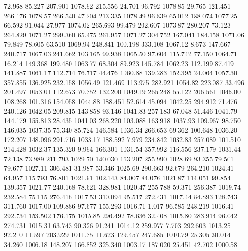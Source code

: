   72.968   85.227  207.901      1078.92
 215.556   24.701   96.792      1078.85
  29.765  121.451  266.176      1078.57
 266.540   47.204  213.335      1078.49
  96.839   65.012  188.074      1077.25
  66.592   91.044   27.977      1074.02
 265.693   99.479  202.607      1073.87
 280.207   73.123  264.829      1071.27
 299.360   65.475  261.957      1071.27
 304.752  167.041  184.158      1071.06
  79.849   78.605   63.510      1069.94
 248.841  100.198  333.108      1067.12
   8.673  147.667  240.717      1067.03
 241.662  103.165   99.938      1065.50
  97.604  115.742   77.150      1064.71
  16.214  149.368  199.480      1063.77
  68.304   89.923  145.784      1062.23
 112.199   87.419  141.887      1061.17
 112.714   76.717   44.476      1060.88
 139.283  152.395   24.064      1057.30
 357.855  136.925  232.158      1056.49
 121.469  113.975  282.921      1054.82
 223.087   33.496  201.497      1053.01
 112.673   70.352  132.200      1049.19
 265.248   55.122  206.561      1045.00
 108.268  101.316  154.058      1044.88
 188.451   52.614   45.094      1042.25
 294.912   71.476  240.126      1042.05
 209.815  143.858   93.146      1041.83
 257.183   67.048   51.446      1041.79
 144.179  155.813   28.435      1041.03
 268.220  103.088  163.918      1037.93
 109.967   98.750  146.035      1037.35
  75.340   85.724  146.584      1036.34
 266.653   69.362  100.648      1036.20
 172.207  148.096  291.716      1033.17
 188.592    7.979  234.842      1032.83
 257.089  101.510  214.428      1032.37
 135.320    9.994  166.301      1031.54
 357.992  116.556  237.179      1031.44
  72.138   73.989  211.793      1029.70
 140.030  163.207  255.990      1028.69
  93.355   79.501   79.677      1027.11
 306.481   31.987   53.346      1025.69
 290.663   92.679  264.210      1024.41
  64.957  115.793   76.801      1021.91
 102.143   84.007   84.076      1021.87
 114.051   99.854  139.357      1021.77
 240.168   78.621  328.981      1020.47
 255.788   59.371  256.387      1019.74
 232.584   75.115  276.418      1017.53
 310.094   95.517  272.431      1017.44
  84.893  128.743  311.760      1017.00
 109.886   97.677  155.293      1016.71
   1.017   96.585  248.219      1016.41
 292.734  153.502  176.175      1015.85
 296.492   78.636   32.408      1015.80
 283.914   96.042  274.731      1015.31
  63.743   90.326   91.241      1014.12
 259.977    7.703  292.603      1013.25
  92.210   11.597  203.929      1011.35
  11.623  129.457  247.685      1010.79
  25.305   30.014   34.260      1006.18
 148.207  166.852  325.340      1003.17
 187.020   25.451   42.702      1000.58

